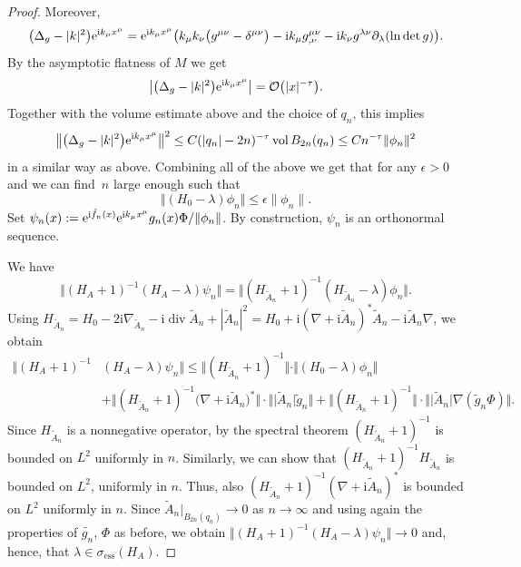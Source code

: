 \documentclass[10pt,a4paper]{amsart}
\numberwithin{equation}{section}
\begin{document}
\begin{proof}
Moreover, \[ \bigl(\Delta_g - |k|^2\bigr) {\rm e}^{{\mathrm{i}}k_\mu x^\mu} = {\rm e}^{{\mathrm{i}}k_\mu x^\mu} \bigl(k_\mu k_\nu \bigl(g^{\mu\nu} -\delta^{\mu\nu}\bigr) -{\mathrm{i}}k_\mu g^{\mu\nu}_{,\nu} - {\mathrm{i}}k_\nu g^{\lambda \nu}\partial_\lambda (\ln \det   g)\bigr).\]
By the asymptotic flatness of $M$ we get
\[ \bigl|\bigl(\Delta_g - |k|^2\bigr) {\rm e}^{{\mathrm{i}}k_\mu x^\mu}\bigr|=\mathcal{O}\bigl(|x|^{-{\tau}}\bigr).\]
Together with the volume estimate above and the choice of $q_n$, this implies
\[\bigl\Vert \bigl(\Delta_g - |k|^2\bigr) {\rm e}^{{\mathrm{i}}k_\mu x^\mu}\bigr\Vert^2 \leq C (|q_n|-2n)^{-\tau} \operatorname{vol}  B_{2n}(q_n) \leq C n^{-\tau} \| \phi_n\|^2
\]
in a similar way as above.
Combining all of the above we get that for any $\epsilon>0$ and we can find~$n$ large enough such that{\samepage
\[
\Vert (H_0 -\lambda)\phi_n\Vert \leq \epsilon \| \phi_n\|.
\]
Set $\psi_n(x) := {\rm e}^{{\mathrm{i}}\tilde{f}_n(x)} {\rm e}^{{\mathrm{i}}k_\mu x^\mu} {g}_n(x)\Phi / \|\phi_n\|$. By construction, $\psi_n$ is an orthonormal sequence.}
	
We have
\[\bigl\Vert (H_A+1)^{-1}(H_A-\lambda)\psi_n\bigr\Vert = \bigl\Vert (H_{\tilde{A}_n}+1)^{-1}(H_{\tilde{A}_n}-\lambda)\phi_n\bigr\Vert.\]
Using $ H_{\tilde{A}_n} = H_0 -2{\mathrm{i}}  \nabla_{\tilde{A}_n} -{\mathrm{i}}  \operatorname{div} \tilde{A}_n +|\tilde{A}_n|^2 =H_0 +{\mathrm{i}}  (\nabla +{\mathrm{i}}\tilde{A}_n)^* \tilde{A}_n - {\mathrm{i}}\tilde{A}_n\nabla$,
we obtain	
\begin{align*}
\bigl\Vert (H_A+1)^{-1}&(H_A-\lambda)\psi_n\bigr\Vert
\leq\bigl\Vert (H_{\tilde{A}_n}+1)^{-1}\bigr\Vert \cdot \Vert (H_0 -\lambda)\phi_n\Vert\\
& +\bigl\Vert (H_{\tilde{A}_n}+1)^{-1} \bigl(\nabla +{\mathrm{i}}\tilde{A}_n\bigr)^*\bigr\Vert\cdot \bigl\Vert \bigl|\tilde{A}_n\bigr| \tilde{g}_n\bigl\Vert
+\bigl\Vert (H_{\tilde{A}_n}+1)^{-1} \bigr\Vert \cdot \bigl\Vert \bigl|\tilde{A}_n\bigr| \nabla (\tilde{g}_n \Phi)\bigr\Vert.
\end{align*}
Since $H_{\tilde{A}_n}$ is a nonnegative operator, by the spectral theorem $(H_{\tilde{A}_n}+1)^{-1}$ is bounded on $L^2$ uniformly in $n$. Similarly, we can show that $(H_{\tilde{A}_n}+1)^{-1} H_{\tilde{A}_n}$ is bounded on $L^2$, uniformly in $n$. Thus, also $(H_{\tilde{A}_n}+1)^{-1} (\nabla +{\mathrm{i}}\tilde{A}_n)^* $ is bounded on $L^2$ uniformly in $n$. Since $\tilde{A}_n|_{B_{2n}(q_n)}\to 0$ as $n\to \infty$ and using again the properties of $\tilde{g_n}$, $\Phi$ as before, we obtain $\bigl\Vert (H_A+1)^{-1}(H_A-\lambda)\psi_n\bigr\Vert \to 0$ and, hence, that $\lambda\in \sigma_{\mathrm{ess}} (H_A)$.
	

\end{proof}
\end{document}
